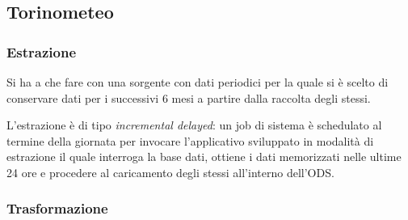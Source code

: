 \subsection{Torinometeo}

\subsubsection{Estrazione}

Si ha a che fare con una sorgente con dati periodici per la quale si è scelto di 
conservare dati per i successivi 6 mesi a partire dalla raccolta degli stessi.

L'estrazione è di tipo \textit{incremental delayed}: un job di sistema è
schedulato al termine della giornata per invocare l'applicativo sviluppato in
modalità di estrazione il quale interroga la base dati, ottiene i dati
memorizzati nelle ultime 24 ore e procedere al caricamento degli stessi
all'interno dell'ODS.

\subsubsection{Trasformazione}

